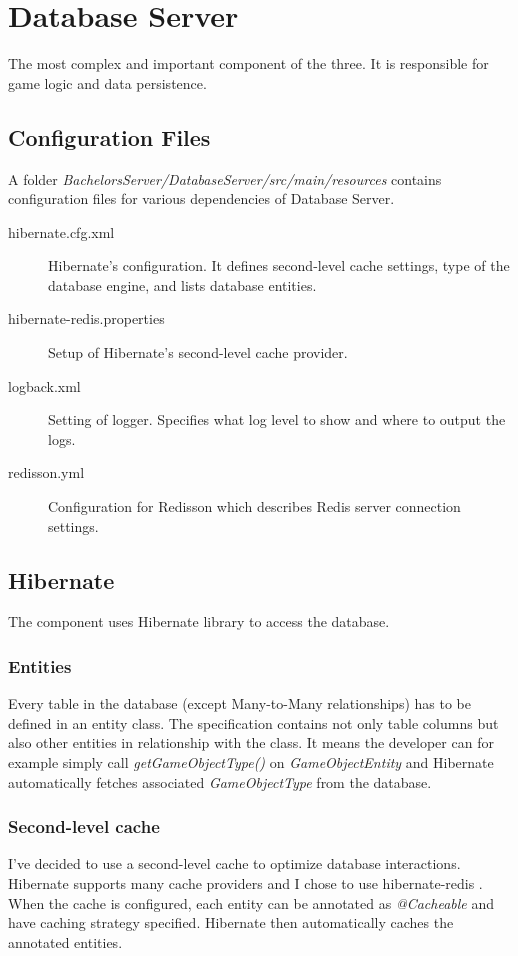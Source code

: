 \section{Database Server}
The most complex and important component of the three. It is responsible for game logic and data persistence.

\subsection{Configuration Files}
A folder \textit{BachelorsServer/DatabaseServer/src/main/resources} contains configuration files for various dependencies of Database Server.
\begin{description}
	\item[hibernate.cfg.xml] Hibernate's configuration. It defines second-level cache settings, type of the database engine, and lists database entities.
	\item[hibernate-redis.properties] Setup of Hibernate's second-level cache provider.
	\item[logback.xml] Setting of logger. Specifies what log level to show and where to output the logs.
	\item[redisson.yml] Configuration for Redisson which describes Redis server connection settings. 
\end{description}

\subsection{Hibernate}
The component uses Hibernate library to access the database.

\subsubsection*{Entities}
Every table in the database (except Many-to-Many relationships) has to be defined in an entity class. The specification contains not only table columns but also other entities in relationship with the class. It means the developer can for example simply call \textit{getGameObjectType()} on \textit{GameObjectEntity} and Hibernate automatically fetches associated \textit{GameObjectType} from the database.

\subsubsection*{Second-level cache}
I've decided to use a second-level cache to optimize database interactions. Hibernate supports many cache providers and I chose to use hibernate-redis \cite{hibernateredis}. When the cache is configured, each entity can be annotated as \textit{@Cacheable} and have caching strategy specified. Hibernate then automatically caches the annotated entities.

